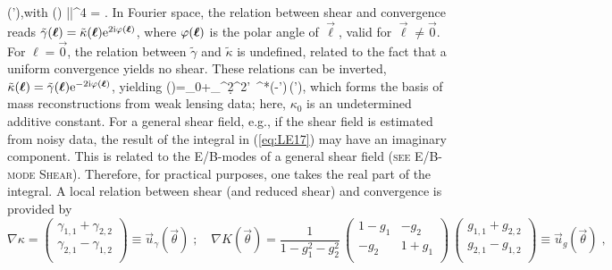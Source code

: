 {  \kappa(\vec\theta')\;,\quad \hbox{with} \quad
  (\vec\theta) \equiv
  {|\vec\theta|^4}
  = \;.
\label{eq:LE16}
\ee
%
In Fourier space, the relation between shear and convergence
reads 
$\tilde\gamma(\boldsymbol{\ell})=\tilde\kappa(\boldsymbol{\ell}){\rm e}^{2{\rm
    i}\varphi(\boldsymbol{\ell})}$, where $\varphi(\boldsymbol{\ell})$ is the polar angle of
$\vec\ell$, valid for $\vec\ell\ne \vec 0$. For $\ell=\vec 0$, the
relation between $\tilde\gamma$ and $\tilde\kappa$ is undefined,
related to the fact that a uniform convergence yields no shear. These
relations can be inverted,
$\tilde\kappa(\boldsymbol{\ell})=\tilde\gamma(\boldsymbol{\ell}){\rm e}^{-2{\rm
    i}\varphi(\boldsymbol{\ell})}$, yielding 
%
\be
\kappa(\vec\theta)=\kappa_0+\int_{^2}\d^2\theta'\,
^*(\vec\theta-\vec\theta')\,\gamma(\vec\theta')\;,
\label{eq:LE17}
\ee
%
which forms the basis of mass reconstructions from weak lensing data;
here, $\kappa_0$ is an undetermined additive constant. 
For a general shear field, e.g., if the shear field is estimated from
noisy data, the result of the integral in (\ref{eq:LE17}) may have an
imaginary component. This is related to the E/B-modes of a general
shear field ({\scshape{\footnotesize see} \gls{E/B-mode Shear}}).
Therefore, for practical purposes, one takes the
real part of the integral.
A local
relation between shear (and reduced shear) and
convergence is
provided by 
%
 \begin{equation}
  \nabla\kappa = \left(\begin{array}{c}
    \gamma_{1,1}+\gamma_{2,2} \\
    \gamma_{2,1}-\gamma_{1,2} \\
  \end{array}\right) \equiv \vec u_\gamma(\vec\theta)\;; \quad
  \nabla K(\vec\theta) = \frac{1}{1-g_1^2-g_2^2}\,
  \left(\begin{array}{cc}
    1-g_1 & -g_2 \\
    -g_2 & 1+g_1 \\
  \end{array}\right)\,
  \left(\begin{array}{c}
    g_{1,1}+g_{2,2} \\
    g_{2,1}-g_{1,2} \\
  \end{array}\right) \equiv\vec u_g(\vec\theta)\;,

\end{equation}}
